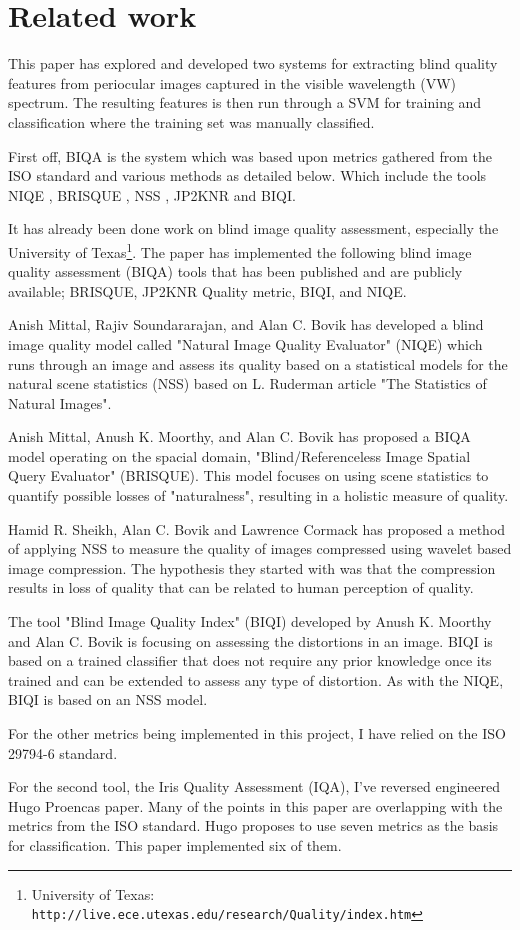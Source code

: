 \section{Related work}
\vspace{-4mm}
This paper has explored and developed two systems for extracting blind quality 
features from periocular images captured in the visible wavelength (VW)
spectrum.
The resulting features is then run through a SVM for training and classification
where the training set was manually classified.

First off, BIQA\cite{biqa} is the system which was based upon metrics gathered
from the ISO standard\cite{iso} and various methods as detailed below. Which
include the tools NIQE \cite{niqe}, BRISQUE \cite{brisque}, NSS \cite{nss},
JP2KNR \cite{jp2knr} and BIQI\cite{biqi}.

It has already been done work on blind image quality assessment, especially the 
University of Texas\footnote{University of Texas:
\texttt{http://live.ece.utexas.edu/research/Quality/index.htm}}.
The paper has implemented the following blind image quality assessment (BIQA)
tools that has been published and are publicly available; BRISQUE, JP2KNR
Quality metric, BIQI, and NIQE.

Anish Mittal, Rajiv Soundararajan, and Alan C. Bovik\cite{niqe} has developed a
blind image quality model called "Natural Image Quality Evaluator" (NIQE) which
runs through an image and assess its quality based on a statistical models for
the natural scene statistics (NSS) based on L. Ruderman article "The Statistics
of Natural Images"\cite{nss}.

Anish Mittal, Anush K. Moorthy, and Alan C. Bovik has proposed a BIQA model
operating on the spacial domain, "Blind/Referenceless Image Spatial Query
Evaluator" (BRISQUE)\cite{brisque}.  This model focuses on using scene
statistics to quantify possible losses of "naturalness", resulting in a holistic
measure of quality.

Hamid R. Sheikh, Alan C. Bovik and Lawrence Cormack \cite{jp2knr} has proposed a
method of applying NSS to measure the quality of images compressed using wavelet
based image compression.  The hypothesis they started with was that the
compression results in loss of quality that can be related to human perception
of quality.

The tool "Blind Image Quality Index" (BIQI)\cite{biqi} developed by Anush
K. Moorthy and Alan C. Bovik is focusing on assessing the distortions
in an image. BIQI is based on a trained classifier that does not require any
prior knowledge once its trained and can be extended to assess any type of
distortion.  As with the NIQE\cite{niqe}, BIQI is based on an NSS model.

For the other metrics being implemented in this project, I have relied on the
ISO 29794-6 standard\cite{iso}.

For the second tool, the Iris Quality Assessment (IQA)\cite{iqa}, I've reversed
engineered Hugo Proencas paper\cite{hugo}.  Many of the points in this
paper are overlapping with the metrics from the ISO standard.  Hugo proposes to
use seven metrics as the basis for classification. This paper implemented
six of them.


